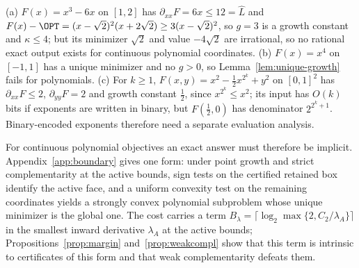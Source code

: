 \begin{example}\label{ex:polylimits}
(a) $F(x)=x^3-6x$ on $[1,2]$ has $\partial_{xx}F=6x\le12=\hat L$ and
$F(x)-\OPT=(x-\sqrt2)^2(x+2\sqrt2)\ge3(x-\sqrt2)^2$, so $g=3$ is a growth
constant and $\kappa\le4$; but its minimizer $\sqrt2$ and value $-4\sqrt2$
are irrational, so no rational exact output exists for continuous polynomial
coordinates. (b) $F(x)=x^4$ on $[-1,1]$ has a unique minimizer and no
$g>0$, so Lemma~\ref{lem:unique-growth} fails for polynomials.
(c) For $k\ge1$, $F(x,y)=x^2-\frac12x^{2^k}+y^2$ on $[0,1]^2$ has
$\partial_{xx}F\le2$, $\partial_{yy}F=2$ and growth constant $\frac12$, since
$x^{2^k}\le x^2$; its input has $O(k)$ bits if exponents are written in
binary, but $F(\frac12,0)$ has denominator $2^{2^k+1}$. Binary-encoded
exponents therefore need a separate evaluation analysis.
\end{example}

For continuous polynomial objectives an exact answer must therefore be
implicit. Appendix~\ref{app:boundary} gives one form: under point growth and
strict complementarity at the active bounds, sign tests on the certified
retained box identify the active face, and a uniform convexity test on the
remaining coordinates yields a strongly convex polynomial subproblem whose
unique minimizer is the global one. The cost carries a term
$B_\lambda=\lceil\log_2\max\{2,C_2/\lambda_A\}\rceil$ in the smallest inward
derivative $\lambda_A$ at the active bounds; Propositions~\ref{prop:margin}
and~\ref{prop:weakcompl} show that this term is intrinsic to certificates of
this form and that weak complementarity defeats them.
